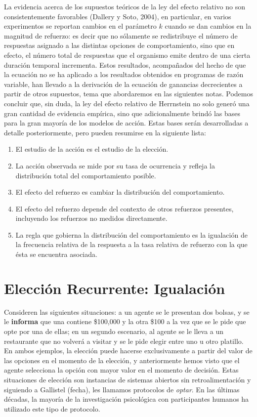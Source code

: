 \documentclass[
  letterpaper,
]{book}
\begin{document}
La evidencia acerca de los supuestos teóricos de la ley del efecto
relativo no son consistentemente favorables (Dallery y Soto, 2004), en
particular, en varios experimentos se reportan cambios en el parámetro
\(k\) cuando se dan cambios en la magnitud de refuerzo: es decir que no
sólamente se redistribuye el número de respuestas asignado a las
distintas opciones de comportamiento, sino que en efecto, el número
total de respuestas que el organismo emite dentro de una cierta duración
temporal incrementa. Estos resultados, acompañados del hecho de que la
ecuación no se ha aplicado a los resultados obtenidos en programas de
razón variable, han llevado a la derivación de la ecuación de ganancias
decrecientes a partir de otros supuestos, tema que abordaremos en las
siguientes notas. Podemos concluir que, sin duda, la ley del efecto
relativo de Herrnstein no solo generó una gran cantidad de evidencia
empírica, sino que adicionalmente brindó las bases para la gran mayoría
de los modelos de acción. Estas bases serán desarrolladas a detalle
posteriormente, pero pueden resumirse en la siguiente lista:

\begin{enumerate}
\def\labelenumi{\arabic{enumi}.}
\item
  El estudio de la acción es el estudio de la elección.
\item
  La acción observada se mide por su tasa de ocurrencia y refleja la
  distribución total del comportamiento posible.
\item
  El efecto del refuerzo es cambiar la distribución del comportamiento.
\item
  El efecto del refuerzo depende del contexto de otros refuerzos
  presentes, incluyendo los refuerzos no medidos directamente.
\item
  La regla que gobierna la distribución del comportamiento es la
  igualación de la frecuencia relativa de la respuesta a la tasa
  relativa de refuerzo con la que ésta se encuentra asociada.
\end{enumerate}


\chapter{Elección Recurrente:
Igualación}\label{elecciuxf3n-recurrente-igualaciuxf3n}

Consideren las siguientes situaciones: a un agente se le presentan dos
bolsas, y se le \textbf{informa} que una contiene \$100,000 y la otra
\$100 a la vez que se le pide que opte por una de ellas; en un segundo
escenario, al agente se le lleva a un restaurante que no volverá a
visitar y se le pide elegir entre uno u otro platillo. En ambos
ejemplos, la elección puede hacerse exclusivamente a partir del valor de
las opciones en el momento de la elección, y anteriormente hemos visto
que el agente selecciona la opción con mayor valor en el momento de
decisión. Estas situaciones de elección son instancias de sistemas
abiertos sin retroalimentación y siguiendo a Gallistel (fecha), les
llamamos protocolos de \emph{optar}. En las últimas décadas, la mayoría
de la investigación psicológica con participantes humanos ha utilizado
este tipo de protocolo.
\end{document}

